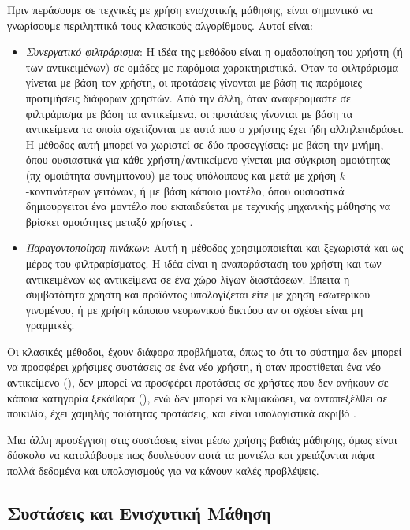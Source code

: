 Πριν περάσουμε σε τεχνικές με χρήση ενισχυτικής μάθησης, είναι σημαντικό να γνωρίσουμε περιληπτικά τους κλασικούς αλγορίθμους. Αυτοί είναι:
\begin{itemize}
    \item \textit{Συνεργατικό φιλτράρισμα}: Η ιδέα της μεθόδου είναι η ομαδοποίηση του χρήστη (ή των αντικειμένων) σε ομάδες με παρόμοια χαρακτηριστικά. Όταν το φιλτράρισμα γίνεται με βάση τον χρήστη, οι προτάσεις γίνονται με βάση τις παρόμοιες προτιμήσεις διάφορων χρηστών. Από την άλλη, όταν αναφερόμαστε σε φιλτράρισμα με βάση τα αντικείμενα, οι προτάσεις γίνονται με βάση τα αντικείμενα τα οποία σχετίζονται με αυτά που ο χρήστης έχει ήδη αλληλεπιδράσει. Η μέθοδος αυτή μπορεί να χωριστεί σε δύο προσεγγίσεις: με βάση την μνήμη, όπου ουσιαστικά για κάθε χρήστη/αντικείμενο γίνεται μια σύγκριση ομοιότητας (πχ ομοιότητα συνημιτόνου) με τους υπόλοιπους και μετά με χρήση $k$-κοντινότερων γειτόνων, ή με βάση κάποιο μοντέλο, όπου ουσιαστικά δημιουργειται ένα μοντέλο που εκπαιδεύεται με τεχνικής μηχανικής μάθησης να βρίσκει ομοιότητες μεταξύ χρήστες \cite{7872755}.
    \item \textit{Παραγοντοποίηση πινάκων}: Αυτή η μέθοδος χρησιμοποιείται και ξεχωριστά και ως μέρος του φιλτραρίσματος. Η ιδέα είναι η αναπαράσταση του χρήστη και των αντικειμένων ως αντικείμενα σε ένα χώρο λίγων διαστάσεων. Έπειτα η συμβατότητα χρήστη και προϊόντος υπολογίζεται είτε με χρήση εσωτερικού γινομένου, ή με χρήση κάποιου νευρωνικού δικτύου αν οι σχέσει είναι μη γραμμικές.
\end{itemize}

Οι κλασικές μέθοδοι, έχουν διάφορα προβλήματα, όπως το ότι το σύστημα δεν μπορεί να προσφέρει χρήσιμες συστάσεις σε ένα νέο χρήστη, ή οταν προστίθεται ένα νέο αντικείμενο (), δεν μπορεί να προσφέρει προτάσεις σε χρήστες που δεν ανήκουν σε κάποια κατηγορία ξεκάθαρα (), ενώ δεν μπορεί να κλιμακώσει, να ανταπεξέλθει σε ποικιλία, έχει χαμηλής ποιότητας προτάσεις, και είναι υπολογιστικά ακριβό \cite{jannach_zanker_felfernig_friedrich_2010}.

Μια άλλη προσέγγιση στις συστάσεις είναι μέσω χρήσης βαθιάς μάθησης, όμως είναι δύσκολο να καταλάβουμε πως δουλεύουν αυτά τα μοντέλα και χρειάζονται πάρα πολλά δεδομένα και υπολογισμούς για να κάνουν καλές προβλέψεις.

\subsection{Συστάσεις και Ενισχυτική Μάθηση}

